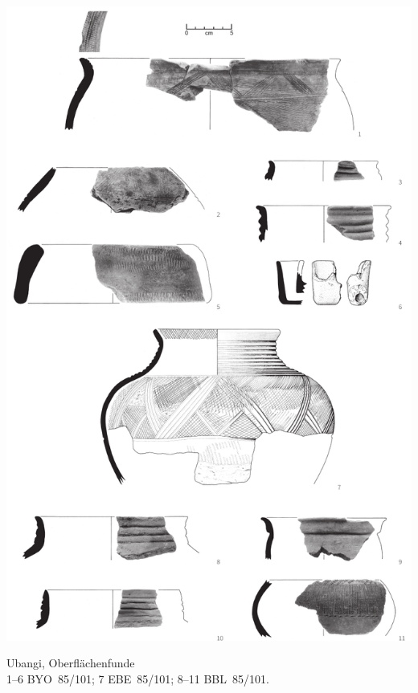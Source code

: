 \begin{pl}[H]
	\includegraphics{plt/Taf5.pdf}
	\vspace{.75em}\caption{\mbox{Ubangi}, Oberflächenfunde \\ 1--6 BYO~85/101; 7 EBE~85/101; 8--11 BBL~85/101.}
	\label{pl:5}
\end{pl}

